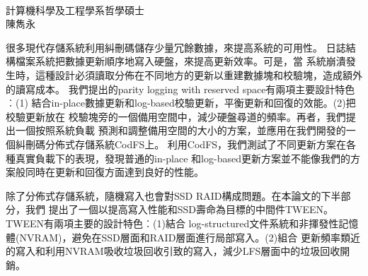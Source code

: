 \\
計算機科學及工程學系哲學碩士\\
陳雋永

\vspace{1cm}

{
\setlength{\parindent}{2em}
很多現代存儲系統利用糾刪碼儲存少量冗餘數據，來提高系統的可用性。
日誌結構檔案系統把數據更新順序地寫入硬盤，來提高更新效率。可是，當
系統崩潰發生時，這種設計必須讀取分佈在不同地方的更新以重建數據塊和校驗塊，造成額外的讀寫成本。
我們提出的parity logging with reserved space有兩項主要設計特色︰(1)
結合in-place數據更新和log-based校驗更新，平衡更新和回復的效能。(2)把校驗更新放在
校驗塊旁的一個備用空間中，減少硬盤尋道的頻率。再者，我們提出一個按照系統負載
預測和調整備用空間的大小的方案，並應用在我們開發的一個糾刪碼分佈式存儲系統CodFS上。
利用CodFS，我們測試了不同更新方案在各種真實負載下的表現，發現普通的in-place
和log-based更新方案並不能像我們的方案般同時在更新和回復方面達到良好的性能。

除了分佈式存儲系統，隨機寫入也會對SSD RAID構成問題。在本論文的下半部分，我們
提出了一個以提高寫入性能和SSD壽命為目標的中間件TWEEN。TWEEN有兩項主要的設計特色︰(1)結合
log-structured文件系統和非揮發性記憶體(NVRAM)，避免在SSD層面和RAID層面進行局部寫入。(2)組合
更新頻率類近的寫入和利用NVRAM吸收垃圾回收引致的寫入，減少LFS層面中的垃圾回收開銷。
}
